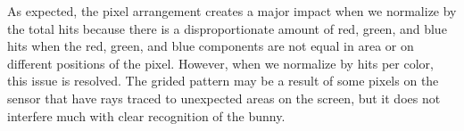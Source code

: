 



As expected, the pixel arrangement creates a major impact when we normalize by the total hits because there is a disproportionate amount of red, green, and blue hits when the red, green, and blue components are not equal in area or on different positions of the pixel. However, when we normalize by hits per color, this issue is resolved. The grided pattern may be a result of some pixels on the sensor that have rays traced to unexpected areas on the screen, but it does not interfere much with clear recognition of the bunny.